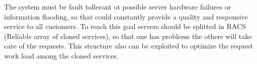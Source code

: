 The system must be fault tollerant ot possible server hardware failures or information flooding, so that could constantly provide a quality and responsive service to all customers. To reach this goal servers should be splitted in RACS (Reliable array of cloned services), so that one has problems the others will take care of the requests. This structure also can be exploited to optimize the request work load among the cloned services.